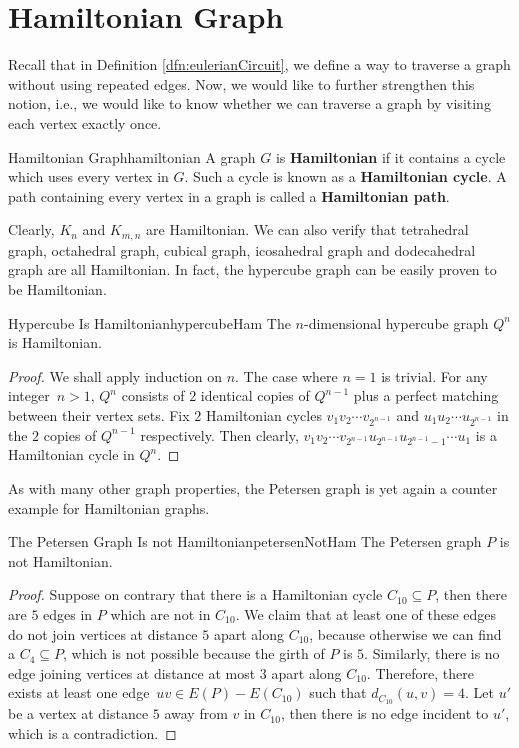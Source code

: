 \documentclass[math]{amznotes}
\theoremstyle{remark}
\begin{document}
\section{Hamiltonian Graph}
Recall that in Definition \ref{dfn:eulerianCircuit}, we define a way to traverse a graph without using repeated edges. Now, we would like to further strengthen this notion, i.e., we would like to know whether we can traverse a graph by visiting each vertex exactly once.
\begin{dfnbox}{Hamiltonian Graph}{hamiltonian}
    A graph $G$ is {\color{red} \textbf{Hamiltonian}} if it contains a cycle which uses every vertex in $G$. Such a cycle is known as a {\color{red} \textbf{Hamiltonian cycle}}. A path containing every vertex in a graph is called a {\color{red} \textbf{Hamiltonian path}}.
\end{dfnbox}
Clearly, $K_n$ and $K_{m, n}$ are Hamiltonian. We can also verify that tetrahedral graph, octahedral graph, cubical graph, icosahedral graph and dodecahedral graph are all Hamiltonian. In fact, the hypercube graph can be easily proven to be Hamiltonian.
\begin{probox}{Hypercube Is Hamiltonian}{hypercubeHam}
    The $n$-dimensional hypercube graph $Q^n$ is Hamiltonian.
    \tcblower
    \begin{proof}
        We shall apply induction on $n$. The case where $n = 1$ is trivial. For any integer~$n > 1$, $Q^n$ consists of $2$ identical copies of $Q^{n - 1}
        $ plus a perfect matching between their vertex sets. Fix $2$ Hamiltonian cycles $v_1v_2\cdots v_{2^{n - 1}}$ and $u_1u_2\cdots u_{2^{n - 1}}$ in the $2$ copies of $Q^{n - 1}$ respectively. Then clearly, $v_1v_2\cdots v_{2^{n - 1}}u_{2^{n - 1}}u_{2^{n - 1} - 1}\cdots u_1$ is a Hamiltonian cycle in $Q^n$.
    \end{proof}
\end{probox}
As with many other graph properties, the Petersen graph is yet again a counter example for Hamiltonian graphs.
\begin{probox}{The Petersen Graph Is not Hamiltonian}{petersenNotHam}
    The Petersen graph $P$ is not Hamiltonian.
    \tcblower
    \begin{proof}
        Suppose on contrary that there is a Hamiltonian cycle $C_{10} \subseteq P$, then there are $5$ edges in $P$ which are not in $C_{10}$. We claim that at least one of these edges do not join vertices at distance $5$ apart along $C_{10}$, because otherwise we can find a $C_4 \subseteq P$, which is not possible because the girth of $P$ is $5$. Similarly, there is no edge joining vertices at distance at most $3$ apart along $C_{10}$. Therefore, there exists at least one edge~$uv \in E(P) - E(C_{10})$ such that $d_{C_{10}}(u, v) = 4$. Let $u'$ be a vertex at distance $5$ away from $v$ in $C_{10}$, then there is no edge incident to $u'$, which is a contradiction.
    \end{proof}
\end{probox}
\end{document}
